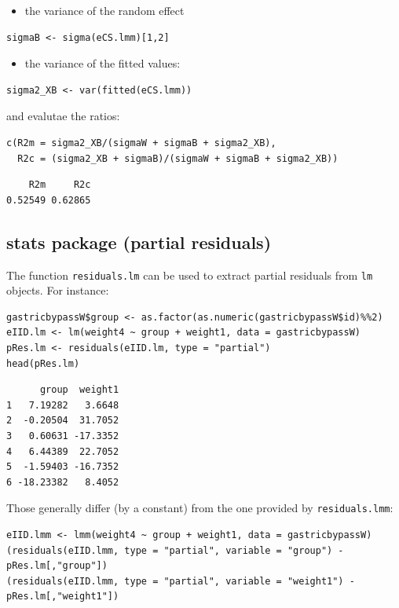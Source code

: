 \documentclass[12pt]{article}
\begin{document}
\begin{itemize}
\item the variance of the random effect
\end{itemize}
\lstset{language=r,label= ,caption= ,captionpos=b,numbers=none}
\begin{lstlisting}
sigmaB <- sigma(eCS.lmm)[1,2]
\end{lstlisting}

\begin{itemize}
\item the variance of the fitted values:
\end{itemize}
\lstset{language=r,label= ,caption= ,captionpos=b,numbers=none}
\begin{lstlisting}
sigma2_XB <- var(fitted(eCS.lmm))
\end{lstlisting}

and evalutae the ratios:
\lstset{language=r,label= ,caption= ,captionpos=b,numbers=none}
\begin{lstlisting}
c(R2m = sigma2_XB/(sigmaW + sigmaB + sigma2_XB),
  R2c = (sigma2_XB + sigmaB)/(sigmaW + sigmaB + sigma2_XB))
\end{lstlisting}

\begin{verbatim}
    R2m     R2c 
0.52549 0.62865
\end{verbatim}

\subsection{stats package (partial residuals)}
\label{sec:org95794de}

The function \texttt{residuals.lm} can be used to extract partial residuals
from \texttt{lm} objects. For instance:
\lstset{language=r,label= ,caption= ,captionpos=b,numbers=none}
\begin{lstlisting}
gastricbypassW$group <- as.factor(as.numeric(gastricbypassW$id)%%2)
eIID.lm <- lm(weight4 ~ group + weight1, data = gastricbypassW)
pRes.lm <- residuals(eIID.lm, type = "partial")
head(pRes.lm)
\end{lstlisting}

\begin{verbatim}
      group  weight1
1   7.19282   3.6648
2  -0.20504  31.7052
3   0.60631 -17.3352
4   6.44389  22.7052
5  -1.59403 -16.7352
6 -18.23382   8.4052
\end{verbatim}


Those generally differ (by a constant) from the one provided by
\texttt{residuals.lmm}:
\lstset{language=r,label= ,caption= ,captionpos=b,numbers=none}
\begin{lstlisting}
eIID.lmm <- lmm(weight4 ~ group + weight1, data = gastricbypassW)
(residuals(eIID.lmm, type = "partial", variable = "group") - pRes.lm[,"group"])
(residuals(eIID.lmm, type = "partial", variable = "weight1") - pRes.lm[,"weight1"])
\end{lstlisting}
\end{document}
